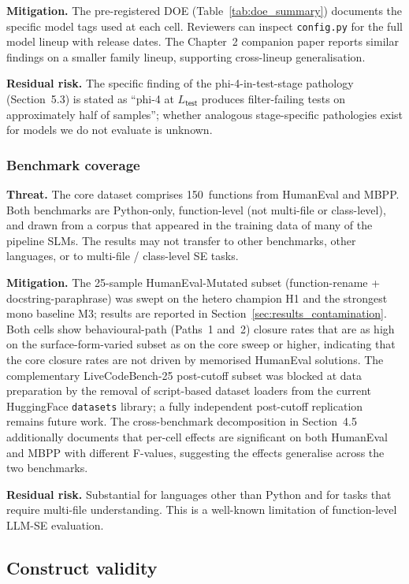 \textbf{Mitigation.} The pre-registered DOE (Table~\ref{tab:doe_summary}) documents the specific model tags used at each cell. Reviewers can inspect \texttt{config.py} for the full model lineup with release dates. The Chapter~2 companion paper reports similar findings on a smaller family lineup, supporting cross-lineup generalisation.

\textbf{Residual risk.} The specific finding of the phi-4-in-test-stage pathology (Section~5.3) is stated as ``phi-4 at $L_{\textsf{test}}$ produces filter-failing tests on approximately half of samples''; whether analogous stage-specific pathologies exist for models we do not evaluate is unknown.

\subsubsection{Benchmark coverage}

\textbf{Threat.} The core dataset comprises 150~functions from HumanEval and MBPP. Both benchmarks are Python-only, function-level (not multi-file or class-level), and drawn from a corpus that appeared in the training data of many of the pipeline SLMs. The results may not transfer to other benchmarks, other languages, or to multi-file / class-level SE tasks.

\textbf{Mitigation.} The 25-sample HumanEval-Mutated subset (function-rename + docstring-paraphrase) was swept on the hetero champion H1 and the strongest mono baseline M3; results are reported in Section~\ref{sec:results_contamination}. Both cells show behavioural-path (Paths~1 and~2) closure rates that are as high on the surface-form-varied subset as on the core sweep or higher, indicating that the core closure rates are not driven by memorised HumanEval solutions. The complementary LiveCodeBench-25 post-cutoff subset was blocked at data preparation by the removal of script-based dataset loaders from the current HuggingFace \texttt{datasets} library; a fully independent post-cutoff replication remains future work. The cross-benchmark decomposition in Section~4.5 additionally documents that per-cell effects are significant on both HumanEval and MBPP with different F-values, suggesting the effects generalise across the two benchmarks.

\textbf{Residual risk.} Substantial for languages other than Python and for tasks that require multi-file understanding. This is a well-known limitation of function-level LLM-SE evaluation.

\subsection{Construct validity}


